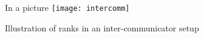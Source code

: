 \begin{frame}{In a picture}
\label{sl:intercomm-picture}
\texttt{[image: intercomm]}

Illustration of ranks in an inter-communicator setup
\end{frame}
